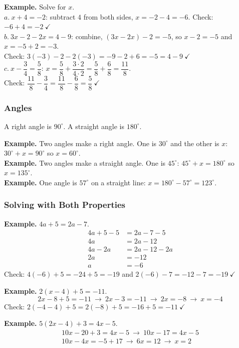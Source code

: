 \documentclass[letter]{article}
\begin{document}
\textbf{Example.} Solve for $x$.\\
$a.\ x+4=-2$: subtract $4$ from both sides, $x=-2-4=-6$. Check: $-6+4=-2\ \checkmark$\\[4pt]
$b.\ 3x-2-2x=4-9$: combine, $(3x-2x)-2=-5$, so $x-2=-5$ and $x=-5+2=-3$.\\
Check: $3(-3)-2-2(-3)=-9-2+6=-5=4-9\ \checkmark$\\[4pt]
$c.\ x-\dfrac34=\dfrac58$: $x=\dfrac58+\dfrac{3\cdot2}{4\cdot2}=\dfrac58+\dfrac68=\dfrac{11}8$.\\
Check: $\dfrac{11}8-\dfrac34=\dfrac{11}8-\dfrac68=\dfrac58\ \checkmark$

\subsubsection*{Angles}

A right angle is $90^\circ$. A straight angle is $180^\circ$.

\textbf{Example.} Two angles make a right angle. One is $30^\circ$ and the other is $x$: $30^\circ+x=90^\circ$ so $x=60^\circ$.\\
\textbf{Example.} Two angles make a straight angle. One is $45^\circ$: $45^\circ+x=180^\circ$ so $x=135^\circ$.\\
\textbf{Example.} One angle is $57^\circ$ on a straight line: $x=180^\circ-57^\circ=123^\circ$.

\subsubsection*{Solving with Both Properties}

\textbf{Example.} $4a+5=2a-7$.
\begin{align*}
  4a+5-5&=2a-7-5\\
  4a&=2a-12\\
  4a-2a&=2a-12-2a\\
  2a&=-12\\
  a&=-6
\end{align*}
Check: $4(-6)+5=-24+5=-19$ and $2(-6)-7=-12-7=-19\ \checkmark$

\textbf{Example.} $2(x-4)+5=-11$.
\[2x-8+5=-11\ \to\ 2x-3=-11\ \to\ 2x=-8\ \to\ x=-4\]
Check: $2(-4-4)+5=2(-8)+5=-16+5=-11\ \checkmark$

\textbf{Example.} $5(2x-4)+3=4x-5$.
\begin{gather*}10x-20+3=4x-5\ \to\ 10x-17=4x-5\\ 10x-4x=-5+17\ \to\ 6x=12\ \to\ x=2\end{gather*}
\end{document}
